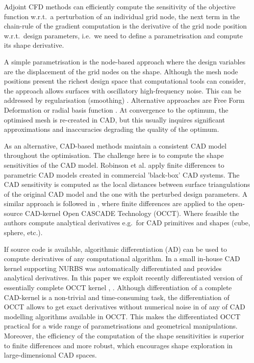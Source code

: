 \documentclass[9pt,academicons]{article}
\begin{document}

Adjoint CFD methods can efficiently compute the sensitivity of the objective
function w.r.t.~a perturbation of an individual grid node, the next term
in the chain-rule of the gradient computation is the derivative of the grid
node position w.r.t.~design parameters, i.e.~we need to define a parametrisation
and compute its shape derivative. 


A simple parametrisation
is the node-based approach where the design variables are
the displacement of the grid nodes on the shape. 
Although the mesh node positions present the richest design space that computational tools can consider, 
the approach allows surfaces with oscillatory high-frequency noise. 
This can be addressed by regularisation (smoothing) \cite{jameson2000brachistronome}.
Alternative approaches are 
Free Form Deformation \cite{smareh2004ffd} or radial basis function \cite{boer2006rbf}. 
At convergence to the optimum, 
the optimised mesh is 
re-created in 
CAD, but this usually inquires significant approximations and inaccuracies degrading the quality of the optimum.
   
As an alternative, 
CAD-based methods 
maintain a consistent CAD model throughout 
the optimisation. 
The challenge here is to compute the shape sensitivities of the CAD model.
Robinson et al. \cite{robinson12fd} apply finite differences to
parametric CAD models created in commercial 'black-box' CAD systems. The CAD sensitivity is computed as the 
local distances between surface triangulations of
the original CAD model and the one with the perturbed design parameters. 
A similar approach is followed in \cite{dannenhofer2015occt}, where finite differences are applied to the open-source CAD-kernel Open CASCADE Technology (OCCT).  
Where feasible the authors compute analytical derivatives e.g.~for
CAD primitives and shapes (cube, sphere, etc.).

If source code is available, algorithmic differentiation (AD) can be used to compute
derivatives of any computational algorithm.
In \cite{xu13:cad-based} a small in-house CAD kernel supporting NURBS was automatically differentiated and provides analytical derivatives.
In this paper we exploit recently differentiated version of 
essentially complete 
OCCT kernel \cite{auriemma2016optimisation}, \cite{banovic17oms}. Although differentiation of a complete CAD-kernel is a non-trivial and time-consuming task,
the differentiation of OCCT
allows
to get exact derivatives without numerical noise in
of any of CAD modelling algorithms available in OCCT. This makes the differentiated OCCT
practical for  a  wide range of parametrisations and geometrical manipulations. Moreover, the efficiency of the 
computation of the shape sensitivities is superior to
finite differences and more robust, which encourages shape exploration in large-dimensional CAD spaces.
\end{document}
